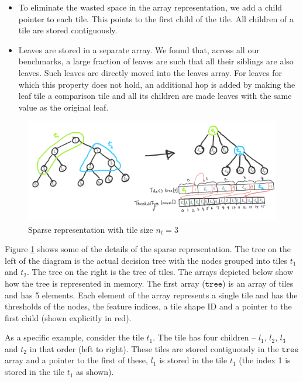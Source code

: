 \begin{itemize}
  \item To eliminate the wasted space in the array representation, we add a child pointer to each tile. This points to the first child of the tile. All children of a tile are stored contiguously.
  \item Leaves are stored in a separate array. We found that, across all our benchmarks, a large fraction of leaves are such that all their siblings are also leaves. Such leaves are directly moved into the leaves array. For leaves for which this property does not hold, an additional hop is added by making the leaf tile a comparison tile and all its children are made leaves with the same value as the original leaf.
\end{itemize}

\begin{figure}
  \centering
  \includegraphics[width=\linewidth]{figures/SparseRep_TileSize3.PNG}
  \caption{Sparse representation with tile size $n_t=3$}
  \label{Fig:SparseRep}
\end{figure}

Figure \ref{Fig:SparseRep} shows some of the details of the sparse representation.
The tree on the left of the diagram is the actual decision tree with the nodes grouped into tiles $t_1$ and $t_2$. The tree on the right is the tree of tiles. The arrays depicted below show how the tree is represented in memory. The first array ($\texttt{tree}$) is an array of tiles and has 5 elements. Each element of the array represents a single tile and has the thresholds of the nodes, the feature indices, a tile shape ID and a pointer to the first child (shown explicitly in red). 

As a specific example, consider the tile $t_1$. The tile has four children -- $l_1$, $l_2$, $l_3$ and $t_2$ in that order (left to right). These tiles are stored contiguously in the $\texttt{tree}$ array and a pointer to the first of these, $l_1$ is stored in the tile $t_1$ (the index 1 is stored in the tile $t_1$ as shown). 

